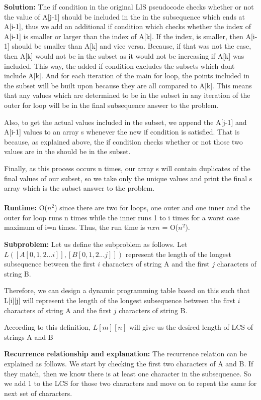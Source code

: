 \documentclass[letterpaper,11pt]{article}
\newcounter{problemid}\stepcounter{problemid}
\def\newproblem{\vspace*{0.5cm}{\bf Problem~\arabic{problemid}\stepcounter{problemid}}\hfill\fbox{\parbox{0.16\textwidth}{\bf Points:}}\par}
\begin{document}
{\bf Solution: } The if condition in the original LIS pseudocode checks whether or not the value of A[j-1] should be included in the in the subsequence which ends at A[i-1], thus we add an additional if condition which checks whether the index of A[i-1] is smaller or larger than the index of A[k]. If the index, is smaller, then A[i-1] should be smaller than A[k] and vice versa. Because, if that was not the case, then A[k] would not be in the subset as it would not be increasing if A[k] was included. This way, the added if condition excludes the subsets which dont include A[k]. And for each iteration of the main for loop, the points included in the subset will be built upon because they are all compared to A[k]. This means that any values which are determined to be in the subset in any iteration of the outer for loop will be in the final subsequence answer to the problem.

Also, to get the actual values included in the subset, we append the A[j-1] and A[i-1] values to an array s whenever the new if condition is satisfied. That is because, as explained above, the if condition checks whether or not those two values are in the should be in the subset.

Finally, as this process occurs n times, our array s will contain duplicates of the final values of our subset, so we take only the unique values and print the final s array which is the subset answer to the problem.\\\\

{\bf Runtime:} O($n^2$) since there are two for loops, one outer and one inner and the outer for loop runs n times while the inner runs 1 to i times for a worst case maximum of i=n times. Thus, the run time is $nxn$ = O($n^2$).


\newproblem
{\bf Subproblem:}
Let us define the subproblem as follows. Let $L([A[0,1,2...i]],[B[0,1,2...j]])$ represent the length of the longest subsequence between the first $i$ characters of string A and the first $j$ characters of string B. 

Therefore, we can design a dynamic programming table based on this such that L[i][j] will represent the length of the longest subsequence between the first $i$ characters of string A and the first $j$ characters of string B.

According to this definition, $L[m][n]$ will give us the desired length of LCS of strings A and B

{\bf Recurrence relationship and explanation:}
The recurrence relation can be explained as follows. We start by checking the first two characters of A and B. If they match, then we know there is at least one character in the subsequence. So we add 1 to the LCS for those two characters and move on to repeat the same for  next set of characters. 
\end{document}
